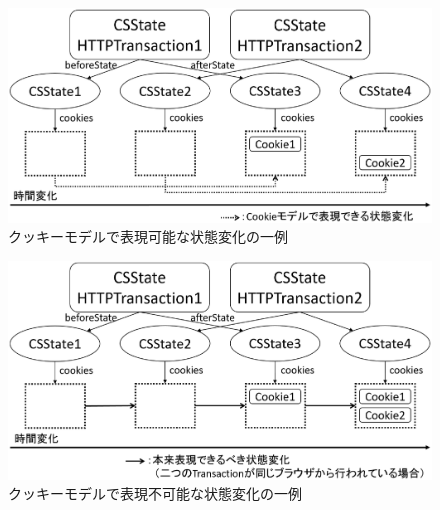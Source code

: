 \documentclass[12pt,a4paper]{jbook}
\begin{document}
\begin{figure}[htb]
\centering
\includegraphics[width=450pt]{./fig/2transaction-a.eps}
\caption{クッキーモデルで表現可能な状態変化の一例}
\label{fig:2transaction-a}
\end{figure}

\begin{figure}[hbt]
\centering
\includegraphics[width=450pt]{./fig/2transaction-b.eps}
\caption{クッキーモデルで表現不可能な状態変化の一例}
\label{fig:2transaction-b}
\end{figure}
\end{document}
